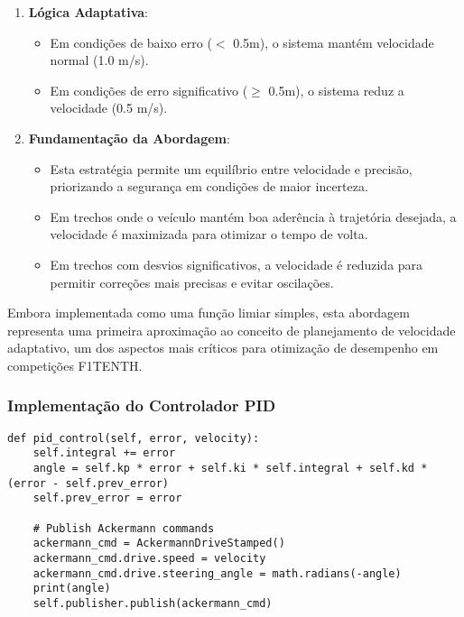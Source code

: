 \begin{enumerate}
    \item \textbf{Lógica Adaptativa}:
          \begin{itemize}
              \item Em condições de baixo erro ($<$ 0.5m), o sistema mantém velocidade normal (1.0
                    m/s).
              \item Em condições de erro significativo ($\geq$ 0.5m), o sistema reduz a velocidade
                    (0.5 m/s).
          \end{itemize}

    \item \textbf{Fundamentação da Abordagem}:
          \begin{itemize}
              \item Esta estratégia permite um equilíbrio entre velocidade e precisão, priorizando
                    a segurança em condições de maior incerteza.
              \item Em trechos onde o veículo mantém boa aderência à trajetória desejada, a
                    velocidade é maximizada para otimizar o tempo de volta.
              \item Em trechos com desvios significativos, a velocidade é reduzida para permitir
                    correções mais precisas e evitar oscilações.
          \end{itemize}
\end{enumerate}

Embora implementada como uma função limiar simples, esta abordagem representa
uma primeira aproximação ao conceito de planejamento de velocidade adaptativo,
um dos aspectos mais críticos para otimização de desempenho em competições
F1TENTH.

\subsubsection{Implementação do Controlador PID}

\begin{verbatim}
def pid_control(self, error, velocity):
    self.integral += error
    angle = self.kp * error + self.ki * self.integral + self.kd * (error - self.prev_error)
    self.prev_error = error

    # Publish Ackermann commands
    ackermann_cmd = AckermannDriveStamped()
    ackermann_cmd.drive.speed = velocity
    ackermann_cmd.drive.steering_angle = math.radians(-angle)
    print(angle)
    self.publisher.publish(ackermann_cmd)
\end{verbatim}

